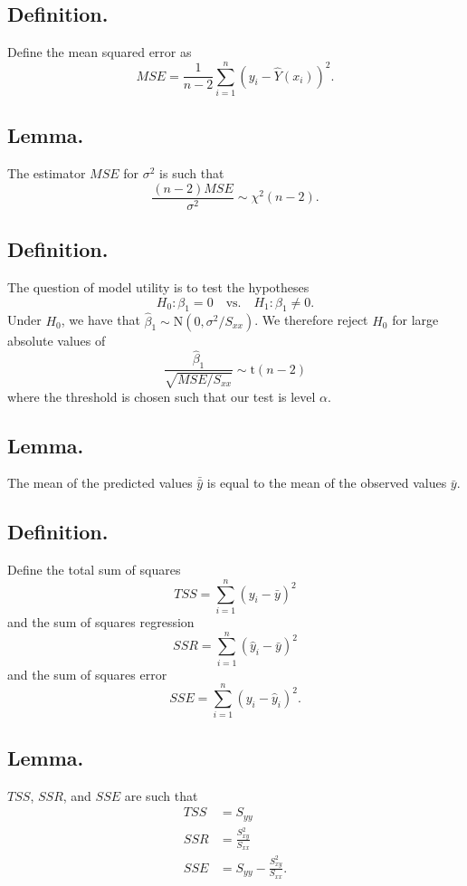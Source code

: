 \documentclass[titlepage]{article}
\begin{document}
\subsection{Definition.} Define the mean squared error as 
$$MSE = \frac{1}{n-2}\sum_{i=1}^{n}(y_{i} - \hat{Y}(x_{i}))^{2}.$$

\subsection{Lemma.} The estimator $MSE$ for $\sigma^{2}$ is such that 
$$\frac{(n-2)MSE}{\sigma^{2}} \sim \chi^{2}(n-2).$$

\subsection{Definition.} The question of model utility is to test the hypotheses 
$$H_{0}: \beta_{1} = 0 \quad \text{vs.} \quad H_{1}: \beta_{1} \neq 0.$$
Under $H_{0}$, we have that $\hat{\beta}_{1} \sim \text{N}(0, \sigma^{2}/S_{xx})$. We therefore reject $H_{0}$ for large absolute values of 
$$\frac{\hat{\beta}_{1}}{\sqrt{MSE/S_{xx}}} \sim \text{t}(n-2)$$
where the threshold is chosen such that our test is level $\alpha$.

\subsection{Lemma.} The mean of the predicted values $\bar{\hat{y}}$ is equal to the mean of the observed values $\bar{y}$.

\subsection{Definition.} Define the total sum of squares 
$$TSS = \sum_{i=1}^{n}(y_{i} - \bar{y})^{2}$$
and the sum of squares regression
$$SSR = \sum_{i=1}^{n}(\hat{y}_{i} - \bar{y})^{2}$$
and the sum of squares error
$$SSE = \sum_{i=1}^{n}(y_{i} - \hat{y}_{i})^{2}.$$

\subsection{Lemma.} $TSS$, $SSR$, and $SSE$ are such that 
\begin{align*}
    TSS &= S_{yy} \\
    SSR &= \frac{S_{xy}^{2}}{S_{xx}} \\
    SSE &= S_{yy} - \frac{S_{xy}^{2}}{S_{xx}}.
\end{align*}
\end{document}
